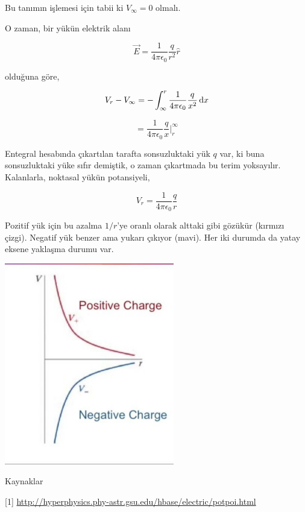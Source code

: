 \documentclass[12pt,fleqn]{article}\usepackage{../../common}
\begin{document}
Bu tanımın işlemesi için tabii ki $V_\infty = 0$ olmalı.

O zaman, bir yükün elektrik alanı

$$
\vec{E} = \frac{1}{4\pi\epsilon_0} \frac{q}{r^2}\hat{r}
$$

olduğuna göre, 

$$
V_r - V_\infty =
-\int _{\infty}^{r}  \frac{1}{4\pi\epsilon_0} \frac{q}{x^2} \,\mathrm{d} x
$$

$$
=
\frac{1}{4\pi\epsilon_0} \frac{q}{x} \bigg| _{r}^{\infty} 
$$

Entegral hesabında çıkartılan tarafta sonsuzluktaki yük $q$ var, ki buna
sonsuzluktaki yüke sıfır demiştik, o zaman çıkartmada bu terim
yoksayılır. Kalanlarla, noktasal yükün potansiyeli,

$$
V_r = \frac{1}{4\pi\epsilon_0} \frac{q}{r}
$$

Pozitif yük için bu azalma $1/r$'ye oranlı olarak alttaki gibi gözükür (kırmızı
çizgi). Negatif yük benzer ama yukarı çıkıyor (mavi). Her iki durumda da yatay
eksene yaklaşma durumu var.

\includegraphics[width=20em]{10_01.jpg}






Kaynaklar

[1] \url{http://hyperphysics.phy-astr.gsu.edu/hbase/electric/potpoi.html}
\end{document}
